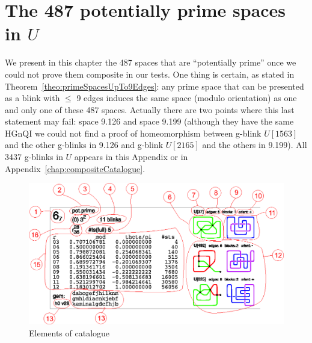 
\section{The 487 potentially prime spaces in $U$}
\label{chap:primeCatalogue}

We present in this chapter the 487 spaces that are ``potentially prime'' once we could
not prove them composite in our tests. One thing is certain, as stated in
Theorem~\ref{theo:primeSpacesUpTo9Edges}: any prime space that can be
presented as a blink with $\leq$ 9 edges induces the same space (modulo
orientation) as one and only one of these 487 spaces. Actually there
are two points where this last statement may fail: space 9.126 and space 9.199 (although
they have the same HGnQI we could not find a proof of homeomorphism
between g-blink $U[1563]$ and the other g-blinks in 9.126 and g-blink $U[2165]$
and the others in 9.199). All 3437 g-blinks in $U$ appears in this Appendix or
in Appendix~\ref{chap:compositeCatalogue}.

\begin{figure}[htp]
   \begin{center}
      \leavevmode
      \includegraphics[width=14.5cm]{A.figs/catalogueexplanation.eps}
   \end{center}
   \vspace{-0.7cm}
   \caption{ Elements of catalogue}
   \label{fig:catalogueExplanation}
\end{figure}

